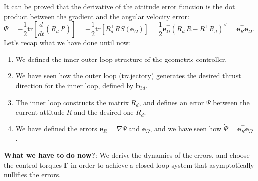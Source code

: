 \documentclass[10pt, a4paper]{report}
\begin{document}
It can be proved that the derivative of the attitude error function is the dot product between the gradient and the angular velocity error:\begin{equation}
    \dot\Psi=-\frac{1}{2}\text{tr}\left[\frac{d}{dt}(R_d^\top R)\right]=
    -\frac{1}{2}\text{tr}\left[R_d^\top R S(\mathbf e_\Omega)\right]=
    \frac{1}{2}\mathbf e_\Omega^\top (R_d^\top R -R^\top R_d)^\vee=\mathbf e_R^\top\mathbf e_\Omega.
\end{equation}
Let's recap what we have done until now:\begin{enumerate}
    \item We defined the inner-outer loop structure of the geometric controller.
    \item We have seen how the outer loop (trajectory) generates the desired thrust direction for the inner loop, defined by $\mathbf b_{3d}$. 
    \item The inner loop constructs the matrix $R_d$, and defines an error $\Psi$ between the current attitude $R$ and the desired one $R_d$.
    \item We have defined the errors $\mathbf e_R=\nabla\Psi$ and $\mathbf e_\Omega$, and we have seen how $\dot\Psi=\mathbf e_R^\top\mathbf e_\Omega$.
\end{enumerate}
\textbf{What we have to do now?}: We derive the dynamics of the errors, and choose the control torques $\boldsymbol{\Gamma}$ in order to achieve a closed loop system that asymptotically nullifies the errors. \bigskip 
\end{document}
